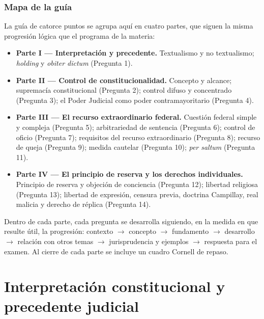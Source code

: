 \documentclass[12pt,oneside]{book}
\begin{document}
\section*{Mapa de la guía}

La guía de catorce puntos se agrupa aquí en cuatro partes, que siguen la misma
progresión lógica que el programa de la materia:

\begin{itemize}[leftmargin=1.4em]
  \item \textbf{Parte I --- Interpretación y precedente.} Textualismo y no
  textualismo; \textit{holding} y \textit{obiter dictum} (Pregunta 1).
  \item \textbf{Parte II --- Control de constitucionalidad.} Concepto y alcance;
  supremacía constitucional (Pregunta 2); control difuso y concentrado
  (Pregunta 3); el Poder Judicial como poder contramayoritario (Pregunta 4).
  \item \textbf{Parte III --- El recurso extraordinario federal.} Cuestión
  federal simple y compleja (Pregunta 5); arbitrariedad de sentencia
  (Pregunta 6); control de oficio (Pregunta 7); requisitos del recurso
  extraordinario (Pregunta 8); recurso de queja (Pregunta 9); medida cautelar
  (Pregunta 10); \textit{per saltum} (Pregunta 11).
  \item \textbf{Parte IV --- El principio de reserva y los derechos
  individuales.} Principio de reserva y objeción de conciencia (Pregunta 12);
  libertad religiosa (Pregunta 13); libertad de expresión, censura previa,
  doctrina Campillay, real malicia y derecho de réplica (Pregunta 14).
\end{itemize}

Dentro de cada parte, cada pregunta se desarrolla siguiendo, en la medida en que
resulte útil, la progresión: contexto $\rightarrow$ concepto $\rightarrow$
fundamento $\rightarrow$ desarrollo $\rightarrow$ relación con otros temas
$\rightarrow$ jurisprudencia y ejemplos $\rightarrow$ respuesta para el examen.
Al cierre de cada parte se incluye un cuadro Cornell de repaso.


\part{Interpretación constitucional y precedente judicial}
\end{document}

